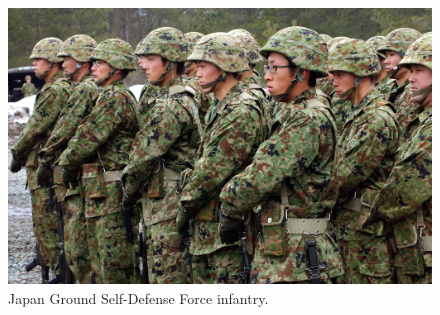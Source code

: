 \documentclass{article}
\begin{document}
\begin{figure}[H]
	\begin{centering}
	\includegraphics[width=0.55\paperwidth]{../ressources/JGDSF_Soldiers}
	\caption{Japan Ground Self-Defense Force infantry. \cite{infantery}}
	\end{centering}
\end{figure}
\end{document}
